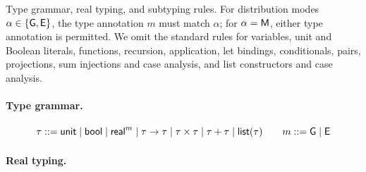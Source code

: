 Type grammar, real typing, and subtyping rules. For distribution modes $\alpha\in\{\mathsf{G},\mathsf{E}\}$, the type annotation $m$ must match $\alpha$; for $\alpha=\mathsf{M}$, either type annotation is permitted. We omit the standard rules for variables, unit and Boolean literals, functions,
recursion, application, let bindings, conditionals, pairs, projections, sum
injections and case analysis, and list constructors and case analysis.

\begingroup
\small
\paragraph{Type grammar.}
\[
 \tau ::= \mathsf{unit}\mid\mathsf{bool}\mid\mathsf{real}^{m}\mid\tau\to\tau
       \mid\tau\times\tau\mid\tau+\tau\mid\mathsf{list}(\tau)
 \qquad m ::= \mathsf{G}\mid\mathsf{E}
\]
\paragraph{Real typing.}
